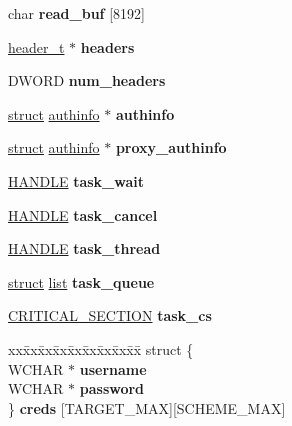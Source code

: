\begin{DoxyCompactItemize}
\item 
\mbox{\label{structrequest__t_a3e1be60787936b885c6fd6d3c1b89e3e}} 
char {\bfseries read\+\_\+buf} \mbox{[}8192\mbox{]}
\item 
\mbox{\label{structrequest__t_a25f5f1b33a58c50cd19a60dde4e434aa}} 
\hyperlink{structheader__t}{header\+\_\+t} $\ast$ {\bfseries headers}
\item 
\mbox{\label{structrequest__t_a144fa6c99c9c391897a9ed71b797797f}} 
D\+W\+O\+RD {\bfseries num\+\_\+headers}
\item 
\mbox{\label{structrequest__t_aa71133f675edda6fd381ea5615972064}} 
\hyperlink{interfacestruct}{struct} \hyperlink{structauthinfo}{authinfo} $\ast$ {\bfseries authinfo}
\item 
\mbox{\label{structrequest__t_ab85d5f9616d06da8fc8bff7a6b96900d}} 
\hyperlink{interfacestruct}{struct} \hyperlink{structauthinfo}{authinfo} $\ast$ {\bfseries proxy\+\_\+authinfo}
\item 
\mbox{\label{structrequest__t_a048ce95353cf5e0c63bd0c5d8ad59ca1}} 
\hyperlink{interfacevoid}{H\+A\+N\+D\+LE} {\bfseries task\+\_\+wait}
\item 
\mbox{\label{structrequest__t_af7565ffd523a4aeeb8552752a2bd6dce}} 
\hyperlink{interfacevoid}{H\+A\+N\+D\+LE} {\bfseries task\+\_\+cancel}
\item 
\mbox{\label{structrequest__t_aa4ec4803916e01a28d8fc452695033ff}} 
\hyperlink{interfacevoid}{H\+A\+N\+D\+LE} {\bfseries task\+\_\+thread}
\item 
\mbox{\label{structrequest__t_a979a3099a6d6a14057a3b975148b32e6}} 
\hyperlink{interfacestruct}{struct} \hyperlink{classlist}{list} {\bfseries task\+\_\+queue}
\item 
\mbox{\label{structrequest__t_a2e2c4635c0273eaa16798faa26583537}} 
\hyperlink{struct___c_r_i_t_i_c_a_l___s_e_c_t_i_o_n}{C\+R\+I\+T\+I\+C\+A\+L\+\_\+\+S\+E\+C\+T\+I\+ON} {\bfseries task\+\_\+cs}
\item 
\mbox{\label{structrequest__t_ab53a35dccb597c5aad374b1218e67816}} 
\begin{tabbing}
xx\=xx\=xx\=xx\=xx\=xx\=xx\=xx\=xx\=\kill
struct \{\\
\>WCHAR $\ast$ {\bfseries username}\\
\>WCHAR $\ast$ {\bfseries password}\\
\} {\bfseries creds} \mbox{[}TARGET\_MAX\mbox{]}\mbox{[}SCHEME\_MAX\mbox{]}\\


\end{tabbing}
\end{DoxyCompactItemize}
